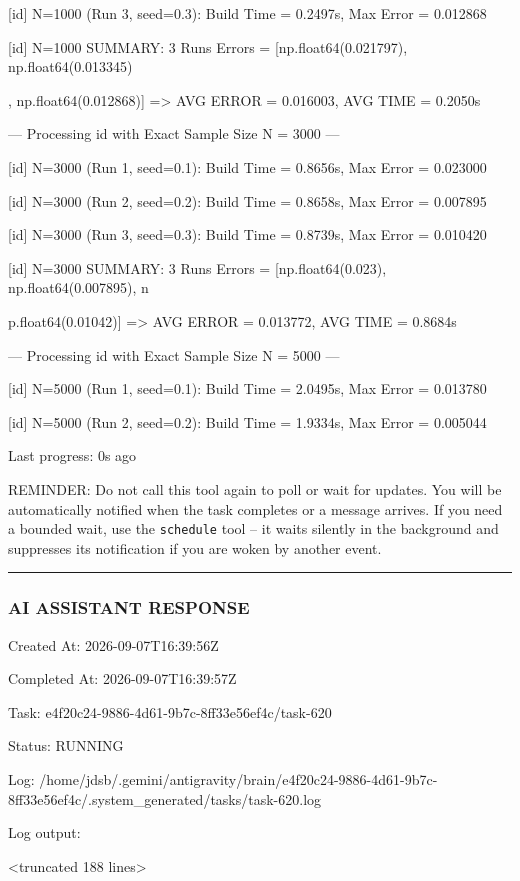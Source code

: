 \documentclass[11pt,a4paper]{article}
\begin{document}
[id] N=1000 (Run 3, seed=0.3): Build Time = 0.2497s, Max Error = 0.012868

[id] N=1000 SUMMARY: 3 Runs Errors = [np.float64(0.021797), np.float64(0.013345)

, np.float64(0.012868)] => AVG ERROR = 0.016003, AVG TIME = 0.2050s

--- Processing id with Exact Sample Size N = 3000 ---

[id] N=3000 (Run 1, seed=0.1): Build Time = 0.8656s, Max Error = 0.023000

[id] N=3000 (Run 2, seed=0.2): Build Time = 0.8658s, Max Error = 0.007895

[id] N=3000 (Run 3, seed=0.3): Build Time = 0.8739s, Max Error = 0.010420

[id] N=3000 SUMMARY: 3 Runs Errors = [np.float64(0.023), np.float64(0.007895), n

p.float64(0.01042)] => AVG ERROR = 0.013772, AVG TIME = 0.8684s

--- Processing id with Exact Sample Size N = 5000 ---

[id] N=5000 (Run 1, seed=0.1): Build Time = 2.0495s, Max Error = 0.013780

[id] N=5000 (Run 2, seed=0.2): Build Time = 1.9334s, Max Error = 0.005044


Last progress: 0s ago



REMINDER: Do not call this tool again to poll or wait for updates. You will be automatically notified when the task completes or a message arrives. If you need a bounded wait, use the \texttt{schedule} tool -- it waits silently in the background and suppresses its notification if you are woken by another event.


\hrule

\subsubsection{AI ASSISTANT RESPONSE}

Created At: 2026-09-07T16:39:56Z

Completed At: 2026-09-07T16:39:57Z

Task: e4f20c24-9886-4d61-9b7c-8ff33e56ef4c/task-620

Status: RUNNING

Log: /home/jdsb/.gemini/antigravity/brain/e4f20c24-9886-4d61-9b7c-8ff33e56ef4c/.system\_generated/tasks/task-620.log

Log output:

<truncated 188 lines>
\end{document}
